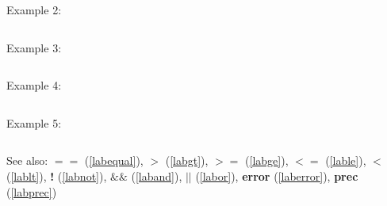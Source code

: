 \noindent Example 2: 
\begin{center}\begin{minipage}{15cm}\begin{Verbatim}[frame=single]
\end{Verbatim}
\end{minipage}\end{center}
\noindent Example 3: 
\begin{center}\begin{minipage}{15cm}\begin{Verbatim}[frame=single]
\end{Verbatim}
\end{minipage}\end{center}
\noindent Example 4: 
\begin{center}\begin{minipage}{15cm}\begin{Verbatim}[frame=single]
\end{Verbatim}
\end{minipage}\end{center}
\noindent Example 5: 
\begin{center}\begin{minipage}{15cm}\begin{Verbatim}[frame=single]
\end{Verbatim}
\end{minipage}\end{center}
See also: \textbf{$==$} (\ref{labequal}), \textbf{$>$} (\ref{labgt}), \textbf{$>=$} (\ref{labge}), \textbf{$<=$} (\ref{lable}), \textbf{$<$} (\ref{lablt}), \textbf{!} (\ref{labnot}), \textbf{$\&\&$} (\ref{laband}), \textbf{$||$} (\ref{labor}), \textbf{error} (\ref{laberror}), \textbf{prec} (\ref{labprec})
